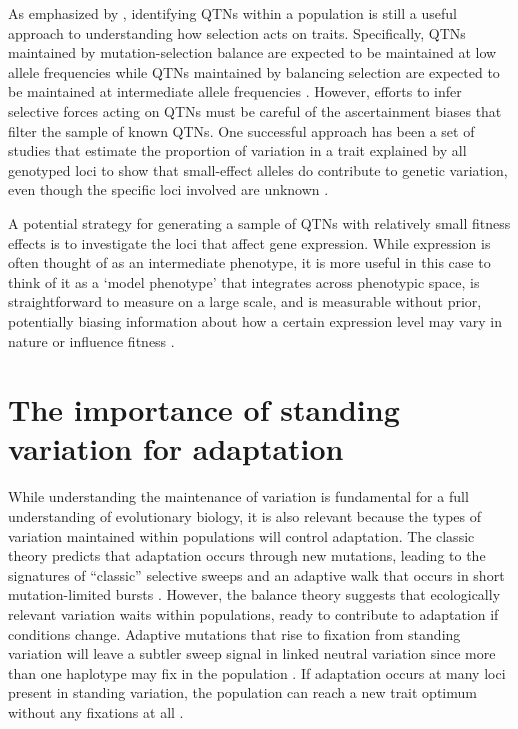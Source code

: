As emphasized by \citep{Lee2014-pi}, identifying QTNs within a population is still a useful approach to understanding how selection acts on traits. Specifically, QTNs maintained by mutation-selection balance are expected to be maintained at low allele frequencies while QTNs maintained by balancing selection are expected to be maintained at intermediate allele frequencies \citep{Barton2002-do}. However, efforts to infer selective forces acting on QTNs must be careful of the ascertainment biases that filter the sample of known QTNs. One successful approach has been a set of studies that estimate the proportion of variation in a trait explained by all genotyped loci to show that small-effect alleles do contribute to genetic variation, even though the specific loci involved are unknown \citep{Yang2010-iu,International_Schizophrenia_Consortium2009-ks}.

A potential strategy for generating a sample of QTNs with relatively small fitness effects is to investigate the loci that affect gene expression. While expression is often thought of as an intermediate phenotype, it is more useful in this case to think of it as a ‘model phenotype’ that integrates across phenotypic space, is straightforward to measure on a large scale, and is measurable without prior, potentially biasing information about how a certain expression level may vary in nature or influence fitness \citep{Rockman2006-yx}.

\section{The importance of standing variation for adaptation}

While understanding the maintenance of variation is fundamental for a full understanding of evolutionary biology, it is also relevant because the types of variation maintained within populations will control adaptation. The classic theory predicts that adaptation occurs through new mutations, leading to the signatures of “classic” selective sweeps and an adaptive walk that occurs in short mutation-limited bursts \citep{Smith1974,Allen_Orr2005-fs,Fisher1930-el}. However, the balance theory suggests that ecologically relevant variation waits within populations, ready to contribute to adaptation if conditions change. Adaptive mutations that rise to fixation from standing variation will leave a subtler sweep signal in linked neutral variation since more than one haplotype may fix in the population \citep{pennings2006_2,pennings2006_3,hermisson2005}. If adaptation occurs at many loci present in standing variation, the population can reach a new trait optimum without any fixations at all \citep{Pritchard2010-uh,Pritchard2010-uq}.

